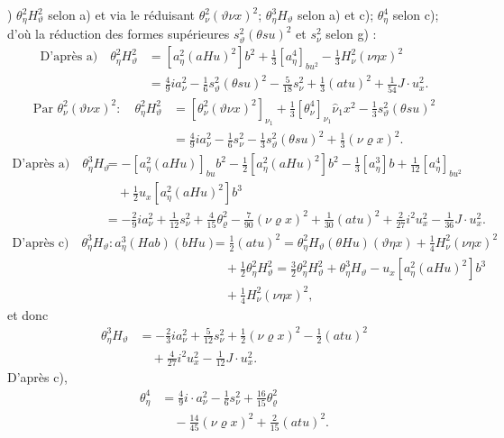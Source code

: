 \documentclass[11pt]{article}
\newcommand{\R}{\varrho}
\begin{document}
) $\theta_\eta^2H_\vartheta^2$ selon a) et via le réduisant $\theta_\nu^2(\vartheta\nu x)^2$; $\theta_\eta^3H_\vartheta$ selon a) et c); $\theta_\eta^4$ selon c); d'où la réduction des formes supérieures $s_\vartheta^2(\theta su)^2$ et $s_\nu^2$ selon g) :
\[
\begin{aligned}
\text{D'après a)}\quad
\theta_\eta^2H_\vartheta^2&=[a_\eta^2(aHu)^2]b^2+\frac13[a_\eta^4]_{bu^2}-\frac13H_\nu^2(\nu\eta x)^2\\
&=\frac49ia_\nu^2-\frac16s_\vartheta^2(\theta su)^2-\frac5{18}s_\nu^2+\frac13(atu)^2+\frac1{54}J\cdot u_x^2.
\end{aligned}
\]
\[
\begin{aligned}
\text{Par }\theta_\nu^2(\vartheta\nu x)^2 :
\quad\theta_\eta^2H_\vartheta^2
&=[\theta_\nu^2(\vartheta\nu x)^2]_{\nu_1}+\frac13[\theta_\nu^4]_{\nu_1}\widehat{\nu}_1x^2-\frac13s_\vartheta^2(\theta su)^2\\
&=\frac49ia_\nu^2-\frac16s_\nu^2-\frac13s_\vartheta^2(\theta su)^2+\frac13(\nu\R x)^2.
\end{aligned}
\]
\[
\begin{aligned}
\text{D'après a)}\quad
\theta_\eta^3H_\vartheta&=-[a_\eta^2(aHu)]_{bu}b^2-\frac12[a_\eta^2(aHu)^2]b^2-\frac13[a_\eta^3]b+\frac1{12}[a_\eta^4]_{bu^2}\\
&\quad+\frac12u_x[a_\eta^2(aHu)^2]b^3\\
&=-\frac29ia_\nu^2+\frac1{12}s_\nu^2+\frac4{15}\theta_\R^2-\frac7{90}(\nu\R x)^2+\frac1{30}(atu)^2+\frac2{27}i^2u_x^2-\frac1{36}J\cdot u_x^2.
\end{aligned}
\]
\[
\begin{aligned}
\text{D'après c)}\quad
\theta_\eta^3H_\vartheta :
a_\eta^3(Hab)(bHu)&=\frac12(atu)^2
=\theta_\eta^2H_\vartheta(\theta Hu)(\vartheta\eta x)+\frac14H_\nu^2(\nu\eta x)^2\\
&\quad+\frac12\theta_\eta^2H_\vartheta^2
=\frac32\theta_\eta^2H_\vartheta^2+\theta_\eta^3H_\vartheta-u_x[a_\eta^2(aHu)^2]b^3\\
&\quad+\frac14H_\nu^2(\nu\eta x)^2,
\end{aligned}
\]
et donc
\[
\begin{aligned}
\theta_\eta^3H_\vartheta&=-\frac23ia_\nu^2+\frac5{12}s_\nu^2+\frac12(\nu\R x)^2-\frac12(atu)^2\\
&\quad+\frac4{27}i^2u_x^2-\frac1{12}J\cdot u_x^2.
\end{aligned}
\]
D'après c),
\[
\begin{aligned}
\theta_\eta^4&=\frac49i\cdot a_\nu^2-\frac16s_\nu^2+\frac{16}{15}\theta_\R^2\\
&\quad-\frac{14}{45}(\nu\R x)^2+\frac2{15}(atu)^2.
\end{aligned}
\]
\end{document}
